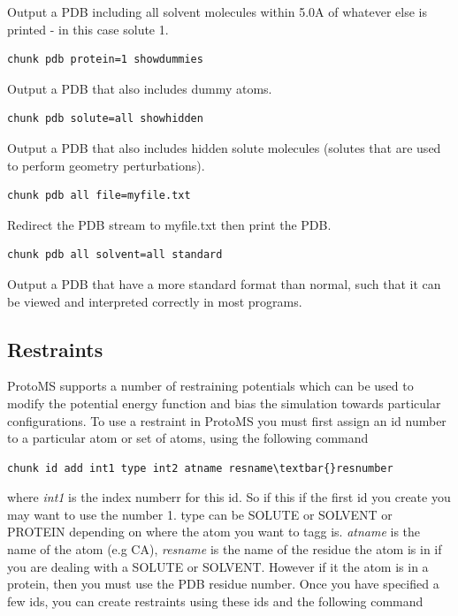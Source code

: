 \documentclass[letterpaper,10pt,english]{sphinxmanual}
\begin{document}
Output a PDB including all solvent molecules within 5.0A of whatever else is printed - in this case solute 1.

\begin{Verbatim}[commandchars=\\\{\}]
chunk pdb protein=1 showdummies
\end{Verbatim}

Output a PDB that also includes dummy atoms.

\begin{Verbatim}[commandchars=\\\{\}]
chunk pdb solute=all showhidden
\end{Verbatim}

Output a PDB that also includes hidden solute molecules (solutes that are used to perform geometry perturbations).

\begin{Verbatim}[commandchars=\\\{\}]
chunk pdb all file=myfile.txt
\end{Verbatim}

Redirect the PDB stream to myfile.txt then print the PDB.

\begin{Verbatim}[commandchars=\\\{\}]
chunk pdb all solvent=all standard
\end{Verbatim}

Output a PDB that have a more standard format than normal, such that it can be viewed and interpreted correctly in most programs.


\subsection{Restraints}
\label{protoms:restraints}
ProtoMS supports a number of restraining potentials which can be used to modify the potential energy function and bias the simulation towards particular configurations. To use a restraint in ProtoMS you must first assign an id number to a particular atom or set of atoms, using the following command

\begin{Verbatim}[commandchars=\\\{\}]
chunk id add int1 type int2 atname resname\textbar{}resnumber
\end{Verbatim}

where \emph{int1} is the index numberr for this id. So if this if the first id you create you may want to use the number 1. type can be SOLUTE or SOLVENT or PROTEIN depending on where the atom you want to tagg is. \emph{atname} is the name of the atom (e.g CA), \emph{resname} is the name of the residue the atom is in if you are dealing with a SOLUTE or SOLVENT. However if it the atom is in a protein, then you must use the PDB residue number.
Once you have specified a few ids, you can create restraints using these ids and the following command
\end{document}
